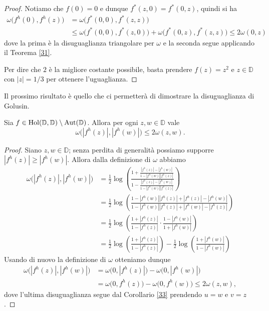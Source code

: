 \begin{proof}
  Notiamo che $f(0)=0$ e dunque $f^*(z,0)=f^*(0,z)$, quindi si ha
  \begin{align*}
    \omega\bigl(f^h(0),f^h(z)\bigr) & = \omega\bigl(f^*(0,0),f^*(z,z)\bigr) \\
    & \le \omega\bigl(f^*(0,0),f^*(z,0)\bigr)+\omega\bigl(f^*(0,z),f^*(z,z)\bigr)\le 2\omega(0,z)
  \end{align*}
  dove la prima è la disuguaglianza triangolare per $\omega$ e la seconda segue applicando il Teorema \ref{31}.

  Per dire che $2$ è la migliore costante possibile, basta prendere $f(z)=z^2$ e $z \in \mathbb{D}$ con $|z|=1/3$ per ottenere l'uguaglianza.
\end{proof}

Il prossimo risultato è quello che ci permetterà di dimostrare la disuguaglianza di Golusin.

\begin{cor} \label{quasigolusin}
  Sia $f \in \text{\normalfont{Hol}}(\mathbb{D},\mathbb{D})\setminus\text{\normalfont{Aut}}(\mathbb{D})$. Allora per ogni $z, w \in \mathbb{D}$ vale
  \begin{equation} \label{quasigol}
    \omega\bigl(|f^h(z)|, |f^h(w)|\bigr) \le 2\omega(z,w).
  \end{equation}
\end{cor}

\begin{proof}
  Siano $z, w \in \mathbb{D}$; senza perdita di generalità possiamo supporre $|f^h(z)| \ge |f^h(w)|$. Allora dalla definizione di $\omega$ abbiamo
  \begin{align*}
    \omega\bigl(|f^h(z)|, |f^h(w)|\bigr) & =\frac{1}{2}\log\left(\frac{1+\frac{|f^h(z)|-|f^h(w)|}{1-|f^h(w)||f^h(z)|}}{1-\frac{|f^h(z)|-|f^h(w)|}{1-|f^h(w)||f^h(z)|}}\right) \\
    & =\frac{1}{2}\log\left(\frac{1-|f^h(w)||f^h(z)|+|f^h(z)|-|f^h(w)|}{1-|f^h(w)||f^h(z)|+|f^h(w)|-|f^h(z)|}\right) \\
    & =\frac{1}{2}\log\left(\frac{1+|f^h(z)|}{1-|f^h(z)|}\cdot\frac{1-|f^h(w)|}{1+|f^h(w)|}\right) \\
    & =\frac{1}{2}\log\left(\frac{1+|f^h(z)|}{1-|f^h(z)|}\right)-\frac{1}{2}\log\left(\frac{1+|f^h(w)|}{1-|f^h(w)|}\right)
  \end{align*}
  Usando di nuovo la definizione di $\omega$ otteniamo dunque
  \begin{align*}
    \omega\bigl(|f^h(z)|, |f^h(w)|\bigr)&=\omega\bigl(0,|f^h(z)|\bigr)-\omega\bigl(0,|f^h(w)|\bigr) \\
    & =\omega\bigl(0,f^h(z)\bigr)-\omega\bigl(0,f^h(w)\bigr) \le 2\omega(z,w),
  \end{align*}
  dove l'ultima disuguaglianza segue dal Corollario \ref{33} prendendo $u=w$ e $v=z$.
\end{proof}

